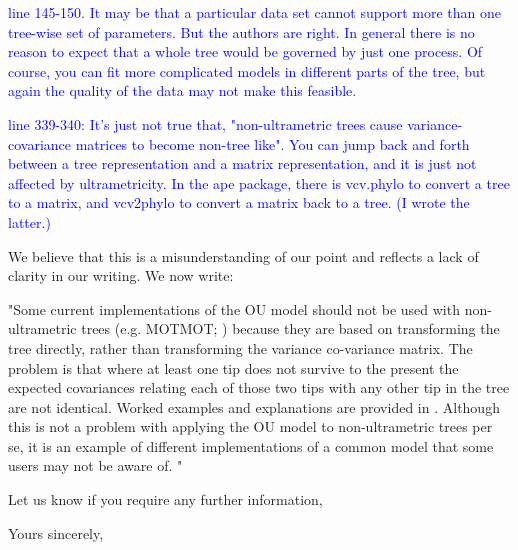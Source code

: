 \documentclass[12pt]{letter}
\begin{document}
\begin{letter}{}
\textcolor{blue}{line 145-150. It may be that a particular data set cannot support more than one tree-wise set of parameters. But the authors are right. In general there is no reason to expect that a whole tree would be governed by just one process. Of course, you can fit more complicated models in different parts of the tree, but again the quality of the data may not make this feasible.}

\textcolor{blue}{line 339-340: It's just not true that, "non-ultrametric trees cause variance-covariance matrices to become non-tree like". You can jump back and forth between a tree representation and a matrix representation, and it is just not affected by ultrametricity. In the ape package, there is vcv.phylo to convert a tree to a matrix, and vcv2phylo to convert a matrix back to a tree. (I wrote the latter.)}

We believe that this is a misunderstanding of our point and reflects a lack of clarity in our writing. We now write: 

"Some current implementations of the OU model should not be used with non-ultrametric trees (e.g. MOTMOT; \citealp{Thomas:2011aa}) because they are based on transforming the tree directly, rather than transforming the variance co-variance matrix. The problem is that where at least one tip does not survive to the present the expected covariances relating each of those two tips with any other tip in the tree are not identical. Worked examples and explanations are provided in \citep{slater2014correction}. Although this is not a problem with applying the OU model to non-ultrametric trees per se, it is an example of different implementations of a common model that some users may not be aware of. "

Let us know if you require any further information,

\closing{Yours sincerely,}

\end{letter}
\end{document}
